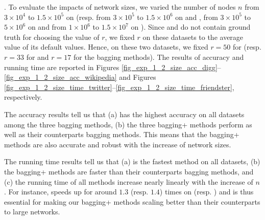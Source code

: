 . To evaluate the impacts of network sizes, we varied the
number of nodes $n$ from $3\times 10^4$ to $1.5\times 10^5$ on \Digg (resp.
from $3\times 10^5$ to $1.5\times 10^6$ on \YouTube and \Wikipedia,
from $3\times 10^5$ to $5\times 10^6$ on \Twitter and
from $1\times 10^6$ to $1.5\times 10^7$ on \Friendster).
Since \Twitter and \Friendster do not contain ground truth for choosing the value of $r$,
we fixed $r$ on these datasets to the average value of
its default values. Hence, on these two datasets, we fixed $r = 50$ for \NMF
(resp. $r = 33$ for \BIGCLAM and $r = 17$ for the bagging methods). The results
of accuracy and running time are reported in Figures \ref{fig_exp_1_2_size_acc_digg}--\ref{fig_exp_1_2_size_acc_wikipedia}
and Figures \ref{fig_exp_1_2_size_time_twitter}--\ref{fig_exp_1_2_size_time_friendster}, respectively.



The accuracy results tell us that (a) \Biased has the highest accuracy on all
datasets among the three bagging methods, (b) the three bagging+ methods perform as well as their counterparts
bagging methods. This means that the bagging+ methods are also accurate and
robust with the increase of network sizes.

The running time results tell us that (a) \Biasedp is the fastest method on all
datasets, (b) the bagging+ methods are faster than their counterparts bagging
methods, and (c) the running time of all methods increase nearly linearly with the
increase of $n$. For instance, \Biasedp speeds up \Biased for around
$1.3$ (resp. $1.4$) times on \Twitter (resp. \Friendster) and is thus essential for
making our bagging+ methods scaling better than their counterparts to large networks.




